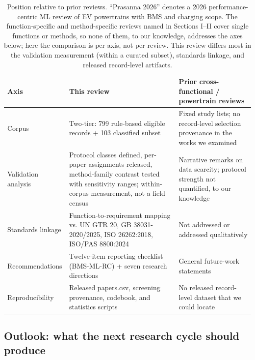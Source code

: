 \documentclass[journal]{IEEEtran}
\begin{document}
\begin{table}[!t]
\caption{Position relative to prior reviews. ``Prasanna 2026'' denotes a 2026 performance-centric ML review of EV powertrains with BMS and charging scope. The function-specific and method-specific reviews named in Sections I--II cover single functions or methods, so none of them, to our knowledge, addresses the axes below; here the comparison is per axis, not per review. This review differs most in the validation measurement (within a curated subset), standards linkage, and released record-level artifacts.}
\label{tab:TABLE_POSITION}
\centering
\footnotesize
\begin{tabular}{|p{0.70in}|p{2.97in}|p{2.97in}|}
\hline
\textbf{Axis} & \textbf{This review} & \textbf{Prior cross-functional / powertrain reviews} \\
\hline
Corpus & Two-tier: 799 rule-based eligible records + 103 classified subset & Fixed study lists; no record-level selection provenance in the works we examined \\
Validation analysis & Protocol classes defined, per-paper assignments released, method-family contrast tested with sensitivity ranges; within-corpus measurement, not a field census & Narrative remarks on data scarcity; protocol strength not quantified, to our knowledge \\
Standards linkage & Function-to-requirement mapping vs. UN GTR 20, GB 38031-2020/2025, ISO 26262:2018, ISO/PAS 8800:2024 & Not addressed or addressed qualitatively \\
Recommendations & Twelve-item reporting checklist (BMS-ML-RC) + seven research directions & General future-work statements \\
Reproducibility & Released papers.csv, screening provenance, codebook, and statistics scripts & No released record-level dataset that we could locate \\
\hline
\end{tabular}
\end{table}

\subsection{Outlook: what the next research cycle should produce}
\end{document}
